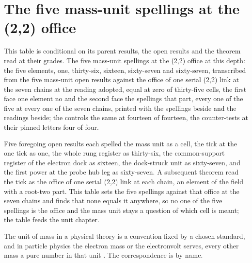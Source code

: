 \section{The five mass-unit spellings at the (2,2) office}\label{mod:VIII-1-D542746-the-five-mass-unit-spellings-at-the-two-two-office}
\begin{chtable}\label{box:VIII-1-D542746-the-five-mass-unit-spellings-at-the-two-two-office:1}
This table is conditional on its parent results, the open results and the theorem read at their grades. The five mass-unit spellings at the (2,2) office at this depth: the five elements, one, thirty-six, sixteen, sixty-seven and sixty-seven, transcribed from the five mass-unit open results against the office of one serial (2,2) link at the seven chains at the reading adopted, equal at zero of thirty-five cells, the first face one element no and the second face the spellings that part, every one of the five at every one of the seven chains, printed with the spellings beside and the readings beside; the controls the same at fourteen of fourteen, the counter-tests at their pinned letters four of four.
\end{chtable}
Five foregoing open results each spelled the mass unit as a cell, the tick at the one tick as one, the whole rung register as thirty-six, the common-support register of the electron dock as sixteen, the dock-struck unit as sixty-seven, and the first power at the probe hub leg as sixty-seven. A subsequent theorem read the tick as the office of one serial (2,2) link at each chain, an element of the field with a root-two part. This table sets the five spellings against that office at the seven chains and finds that none equals it anywhere, so no one of the five spellings is the office and the mass unit stays a question of which cell is meant; the table feeds the unit chapter.
\begin{chbridge}
The unit of mass in a physical theory is a convention fixed by a chosen standard, and in particle physics the electron mass or the electronvolt serves, every other mass a pure number in that unit \cite{Weinberg1995,Jackson1998}. The correspondence is by name.
\end{chbridge}
